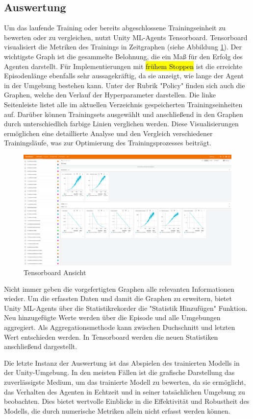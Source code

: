 \subsection{Auswertung}
Um das laufende Training oder bereits abgeschlossene Trainingseinheit zu bewerten oder zu vergleichen, nutzt Unity ML-Agents Tensorboard. Tensorboard visualisiert die Metriken des Trainings in Zeitgraphen (siehe Abbildung \ref{fig:tensorboard}). Der wichtigste Graph ist die gesammelte Belohnung, die ein Maß für den Erfolg des Agenten darstellt. Für Implementierungen mit \hl{frühem Stoppen} ist die erreichte Episodenlänge ebenfalls sehr aussagekräftig, da sie anzeigt, wie lange der Agent in der Umgebung bestehen kann. Unter der Rubrik "Policy" finden sich auch die Graphen, welche den Verlauf der Hyperparameter darstellen. Die linke Seitenleiste listet alle im aktuellen Verzeichnis gespeicherten Trainingseinheiten auf. Darüber können Trainingsets ausgewählt und anschließend in den Graphen durch unterschiedlich farbige Linien verglichen werden. Diese Visualisierungen ermöglichen eine detaillierte Analyse und den Vergleich verschiedener Trainingsläufe, was zur Optimierung des Trainingsprozesses beiträgt.

\begin{figure}[H]
  \centering  
  \includegraphics[scale=0.15]{img/tensorboard.png}
  \caption{Tensorboard Ansicht}
  \label{fig:tensorboard}
\end{figure}

Nicht immer geben die vorgefertigten Graphen alle relevanten Informationen wieder. Um die erfassten Daten und damit die Graphen zu erweitern, bietet Unity ML-Agents über die Statistikrekorder die "Statistik Hinzufügen" Funktion. Neu hinzugefügte Werte werden über die Episode und alle Umgebungen aggregiert. Als Aggregationsmethode kann zwischen Duchschnitt und letzten Wert entschieden werden. In Tensorboard werden die neuen Statistiken anschließend dargestellt.

Die letzte Instanz der Auswertung ist das Abspielen des trainierten Modells in der Unity-Umgebung. In den meisten Fällen ist die grafische Darstellung das zuverlässigste Medium, um das trainierte Modell zu bewerten, da sie ermöglicht, das Verhalten des Agenten in Echtzeit und in seiner tatsächlichen Umgebung zu beobachten. Dies bietet wertvolle Einblicke in die Effektivität und Robustheit des Modells, die durch numerische Metriken allein nicht erfasst werden können.